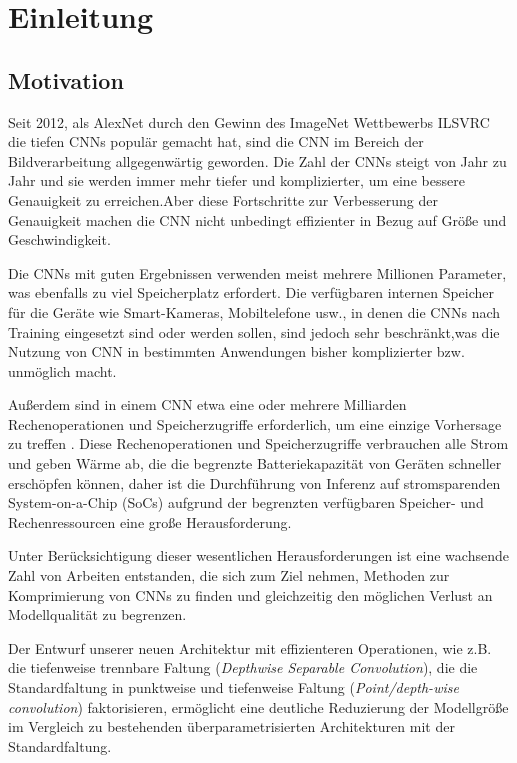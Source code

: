 \documentclass[12pt,a4paper]{scrartcl}
\numberwithin{equation}{section}
\begin{document}
\section{Einleitung}
\subsection{Motivation}\label{motivation}
Seit 2012, als AlexNet \cite{AlexNet} durch den Gewinn des ImageNet Wettbewerbs \ac{ILSVRC} die tiefen \acsp{CNN} populär gemacht hat, sind die \acs{CNN} im Bereich der Bildverarbeitung allgegenwärtig geworden. Die Zahl der CNNs steigt von Jahr zu Jahr und sie werden immer mehr tiefer und komplizierter, um eine bessere Genauigkeit zu erreichen.Aber diese Fortschritte zur Verbesserung der Genauigkeit machen die CNN nicht unbedingt effizienter in Bezug auf Größe und Geschwindigkeit.

Die \acsp{CNN} mit guten Ergebnissen verwenden  meist mehrere Millionen Parameter, was ebenfalls zu viel Speicherplatz erfordert. Die verfügbaren internen Speicher für die Geräte wie Smart-Kameras, Mobiltelefone usw., in denen die CNNs nach Training eingesetzt sind oder werden sollen, sind jedoch sehr beschränkt,was die Nutzung von CNN in bestimmten Anwendungen bisher komplizierter bzw. unmöglich macht. 

Außerdem sind in einem CNN  etwa eine oder mehrere Milliarden Rechenoperationen und Speicherzugriffe erforderlich, um eine einzige Vorhersage zu treffen \cite{prunetoprune}. Diese Rechenoperationen und Speicherzugriffe verbrauchen alle Strom und geben Wärme ab, die die begrenzte Batteriekapazität von Geräten schneller erschöpfen können, daher ist die Durchführung von Inferenz auf stromsparenden System-on-a-Chip (SoCs) aufgrund der begrenzten verfügbaren Speicher- und Rechenressourcen eine große Herausforderung.

Unter Berücksichtigung dieser wesentlichen Herausforderungen ist eine wachsende Zahl von Arbeiten entstanden, die sich zum Ziel nehmen, Methoden zur Komprimierung von \acsp{CNN} zu finden und gleichzeitig den möglichen Verlust an Modellqualität zu begrenzen.

Der Entwurf unserer neuen Architektur mit effizienteren Operationen, wie z.B. die tiefenweise trennbare Faltung (\textit{Depthwise Separable Convolution}), die die Standardfaltung in punktweise und tiefenweise Faltung (\textit{Point/depth-wise convolution}) faktorisieren, ermöglicht eine deutliche Reduzierung der Modellgröße im Vergleich zu bestehenden überparametrisierten Architekturen mit der Standardfaltung.
\end{document}
